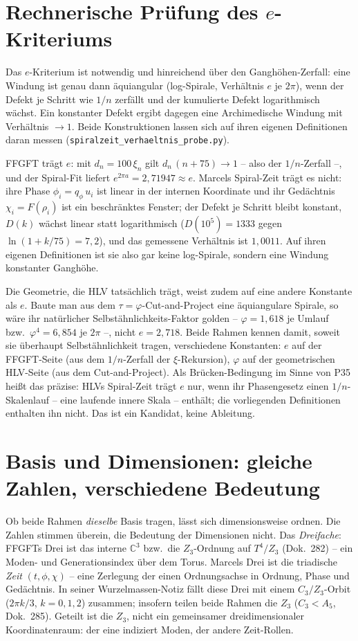 \section{Rechnerische Prüfung des $e$-Kriteriums}
Das $e$-Kriterium ist notwendig und hinreichend über den Ganghöhen-Zerfall: eine Windung ist genau
dann äquiangular (log-Spirale, Verhältnis $e$ je $2\pi$), wenn der Defekt je Schritt wie $1/n$
zerfällt und der kumulierte Defekt logarithmisch wächst. Ein konstanter Defekt ergibt dagegen eine
Archimedische Windung mit Verhältnis $\to1$. Beide Konstruktionen lassen sich auf ihren eigenen
Definitionen daran messen (\texttt{spiralzeit\_verhaeltnis\_probe.py}).

FFGFT trägt $e$: mit $d_n=100\,\xi_n$ gilt $d_n\,(n+75)\to1$ -- also der $1/n$-Zerfall --, und der
Spiral-Fit liefert $e^{2\pi a}=2{,}71947\approx e$. Marcels Spiral-Zeit trägt es nicht: ihre Phase
$\phi_i=q_\phi\,u_i$ ist linear in der internen Koordinate und ihr Gedächtnis $\chi_i=F(\rho_i)$
ist ein beschränktes Fenster; der Defekt je Schritt bleibt konstant, $D(k)$ wächst linear statt
logarithmisch ($D(10^5)=1333$ gegen $\ln(1+k/75)=7{,}2$), und das gemessene Verhältnis ist
$1{,}0011$. Auf ihren eigenen Definitionen ist sie also gar keine log-Spirale, sondern eine Windung
konstanter Ganghöhe.

Die Geometrie, die HLV tatsächlich trägt, weist zudem auf eine andere Konstante als $e$. Baute man
aus dem $\tau=\varphi$-Cut-and-Project eine äquiangulare Spirale, so wäre ihr natürlicher
Selbstähnlichkeits-Faktor golden -- $\varphi=1{,}618$ je Umlauf bzw.\ $\varphi^4=6{,}854$ je $2\pi$
--, nicht $e=2{,}718$. Beide Rahmen kennen damit, soweit sie überhaupt Selbstähnlichkeit tragen,
verschiedene Konstanten: $e$ auf der FFGFT-Seite (aus dem $1/n$-Zerfall der $\xi$-Rekursion),
$\varphi$ auf der geometrischen HLV-Seite (aus dem Cut-and-Project). Als Brücken-Bedingung im Sinne
von P35 heißt das präzise: HLVs Spiral-Zeit trägt $e$ nur, wenn ihr Phasengesetz einen
$1/n$-Skalenlauf -- eine laufende innere Skala -- enthält; die vorliegenden Definitionen enthalten
ihn nicht. Das ist ein Kandidat, keine Ableitung.

\section{Basis und Dimensionen: gleiche Zahlen, verschiedene Bedeutung}
Ob beide Rahmen \emph{dieselbe} Basis tragen, lässt sich dimensionsweise ordnen. Die Zahlen
stimmen überein, die Bedeutung der Dimensionen nicht. Das \emph{Dreifache}: FFGFTs Drei ist das
interne $\mathbb{C}^3$ bzw.\ die $Z_3$-Ordnung auf $T^4/Z_3$ (Dok.~282) -- ein
Moden- und Generationsindex über dem Torus. Marcels Drei ist die triadische \emph{Zeit}
$(t,\phi,\chi)$ -- eine Zerlegung der einen Ordnungsachse in Ordnung, Phase und Gedächtnis. In
seiner Wurzelmassen-Notiz fällt diese Drei mit einem $C_3/Z_3$-Orbit ($2\pi k/3$, $k=0,1,2$)
zusammen; insofern teilen beide Rahmen die $Z_3$ ($C_3<A_5$, Dok.~285). Geteilt ist die $Z_3$,
nicht ein gemeinsamer dreidimensionaler Koordinatenraum: der eine indiziert Moden, der andere
Zeit-Rollen.

